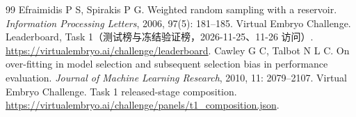 \documentclass[UTF8,zihao=-4,fontset=none,a4paper]{ctexart}
\begin{document}
\begin{thebibliography}{99}
Efraimidis P S, Spirakis P G. Weighted random sampling with a reservoir. \textit{Information Processing Letters}, 2006, 97(5): 181--185.
Virtual Embryo Challenge. Leaderboard, Task 1（测试榜与冻结验证榜，2026-11-25、11-26 访问）. \url{https://virtualembryo.ai/challenge/leaderboard}.
Cawley G C, Talbot N L C. On over-fitting in model selection and subsequent selection bias in performance evaluation. \textit{Journal of Machine Learning Research}, 2010, 11: 2079--2107.
Virtual Embryo Challenge. Task 1 released-stage composition. \url{https://virtualembryo.ai/challenge/panels/t1_composition.json}.
\end{thebibliography}
\endgroup
\end{document}
